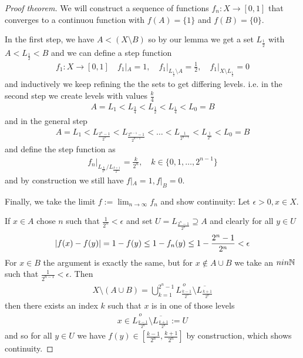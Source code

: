 \begin{proof}[Proof theorem]
  We will construct a sequence of functions $f_n: X \to [0,1]$ that converges to a continuou function with $f(A) = \{1\}$ and $f(B) = \{0\}$.

  In the first step, we have $A< (X \setminus B)$ so by our lemma we get a set $L_{\frac{1}{2}}$ with $A < L_{\frac{1}{2}} < B$ and we can define a step function
  \begin{align*}
    f_1: X \to [0,1] \quad f_1|_A = 1, \quad f_1|_{L_{\frac{1}{2}} \setminus A } = \frac{1}{2}, \quad f_1|_{X \setminus L_{\frac{1}{2}}} = 0
  \end{align*}
  and inductively we keep refining the the sets to get differing levels.
  i.e. in the second step we create levels with values $\frac{k}{4}$
  \begin{align*}
    A = L_1 < L_{\frac{3}{4}} < L_{\frac{1}{2}} < L_{\frac{1}{4}} < L_0 = B  
  \end{align*}
  and in the general step 
  \begin{align*}
    A = L_1 < L_{\frac{2^{n}-1}{2^{n}}} < L_{\frac{2^{n-1} -1 }{2^{n-1}}} < \ldots < L_{\frac{1}{2^{n-1}}} < L_{\frac{1}{2^{n}}}<L_0 = B
  \end{align*}
  and define the step function as
  \begin{align*}
    f_n|_{L_{\frac{k}{2^{n}}}/L_{\frac{k+1}{2^{n}}}} = \frac{k}{2^{n}}, \quad k \in \{0,1,\ldots,2^{n-1}\}
  \end{align*}
  and by construction we still have $f|_A = 1, f|_B = 0$.

  Finally, we take the limit $f := \lim_{n \to \infty}f_n$ and show continuity:
  Let $\epsilon > 0, x \in X$.

  If $x \in A$ chose $n$ such that $\frac{1}{2^{n}} < \epsilon$ and set $U = L_{\frac{2^{n}-1}{2^{n}}} \supseteq A$ and clearly for all $y \in U$
  \begin{align*}
    \vert f(x) - f(y)\vert = 1 - f(y) \leq 1 - f_n(y) \leq 1 - \frac{2^{n} - 1}{2^{n}} < \epsilon
  \end{align*}
  For $x \in B$ the argument is exactly the same, but for $x \notin A \cup B$ we take an $n in \mathbb{N}$ such that $\frac{1}{2^{n-1}} < \epsilon$.
  Then
  \begin{align*}
    X \setminus (A \cup B) = \bigcup_{k=1}^{2^{n}-1}
    \stackrel{o}{L_{\frac{k-1}{2^{n}}}} \setminus \overline{L_{\frac{k+1}{2^{n}}}}
  \end{align*}
  then there exists an index $k$ such that $x$ is in one of those levels
  \begin{align*}
    x \in \stackrel{o}{L_{\frac{k-1}{2^{n}}}} \setminus \overline{L_{\frac{k+1}{2^{n}}}} := U
  \end{align*}
  and so for all $y \in U$ we have $f(y) \in [\frac{k-1}{2^{n}}, \frac{k+1}{2^{n}}]$ by construction, which shows continuity.
\end{proof}



